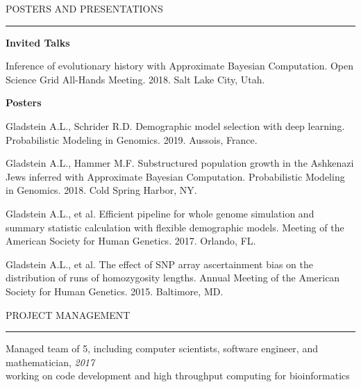 \documentclass{resume} %
\renewenvironment{rSection}[1]{
\sectionskip
\textcolor{RoyalPurple}{\MakeUppercase{#1}}
\sectionlineskip
\hrule
\begin{list}{}{
\setlength{\leftmargin}{1.5em}
}
\item[]
}{
\end{list}
}
\begin{document}
\begin{rSection}{Posters and Presentations}

\textbf{Invited Talks}
\item Inference of evolutionary history with Approximate Bayesian Computation. Open Science Grid All-Hands Meeting. 2018. Salt Lake City, Utah.

\item

\textbf{Posters}
\item Gladstein A.L., Schrider R.D.  Demographic model selection with deep learning.  Probabilistic Modeling in Genomics. 2019. Aussois, France.

\item Gladstein A.L., Hammer M.F. Substructured population growth in the Ashkenazi Jews inferred with Approximate Bayesian Computation. Probabilistic Modeling in Genomics. 2018. Cold Spring Harbor, NY.

\item Gladstein A.L., et al. Efficient pipeline for whole genome simulation and summary statistic calculation with flexible demographic models. Meeting of the American Society for Human Genetics. 2017. Orlando, FL.

\item Gladstein A.L., et al. The effect of SNP array ascertainment bias on the distribution of runs of homozygosity lengths. Annual Meeting of the American Society for Human Genetics. 2015. Baltimore, MD. 


\end{rSection}


\begin{rSection}{Project Management}

\item Managed team of 5, including computer scientists, software engineer, and mathematician, \hfill {\em 2017}\\ 
working on code development and high throughput computing for bioinformatics

\end{rSection}

\end{document}
